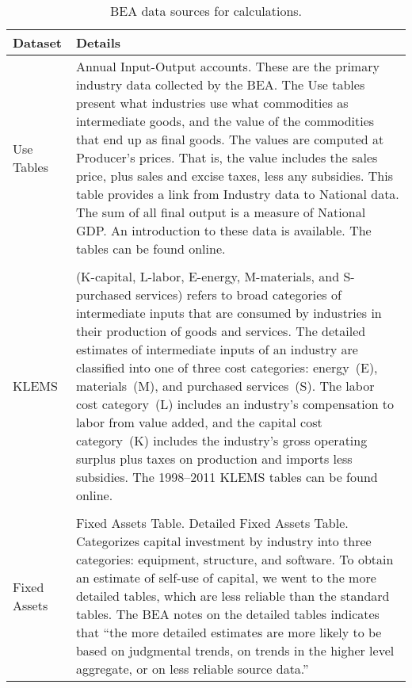 \begin{table}
\caption[BEA data sources for calcuations]{BEA
data sources for calculations.}
\begin{center}
  \begin{tabular}{l @{\hspace{2em}} p{10cm}}
   \toprule 
    Dataset & Details  \\ 

	\midrule
Use Tables & Annual Input-Output accounts. 
	These are the primary industry data collected by the BEA\index{Bureau of Economic Analysis}.
	The Use tables present what industries use what commodities 
	as intermediate goods, and the value of the commodities that end up as final goods. 
	The values are computed at Producer’s prices. 
	That is, the value includes the sales price, plus sales and excise taxes, 
	less any subsidies. 
	This table provides a link from Industry data to National data. 
	The sum of all final output is a measure of National GDP\@.
	An introduction to these data is available.\cite{Streitwieser:2011aa}
	The tables can be found online.\cite{BEAIOData}\\
 &\\

KLEMS & (K-capital, L-labor, E-energy, M-materials, and S-purchased services) 
	refers to broad categories of intermediate inputs 
	that are consumed by industries in their production 
	of goods and services.\cite{Strassner:2005aa}
	The detailed estimates of intermediate inputs of an industry 
	are classified into one of three cost categories:
	energy~(E), materials~(M), and purchased services~(S).
	The labor cost category~(L) includes an industry’s compensation to labor from value added, 
	and the capital cost category~(K) includes the industry’s 
	gross operating surplus plus taxes on production and imports less subsidies.  
	The 1998--2011 KLEMS tables can be found online.\cite{BEAKLEMSData}\\
 & \\
Fixed Assets &  Fixed Assets Table. Detailed Fixed Assets Table. 
	Categorizes capital investment by industry into three categories:
	equipment, structure, and software. 
	To obtain an estimate of self-use of capital, 
	we went to the more detailed tables, 
	which are less reliable than the standard tables. 
	The BEA\index{Bureau of Economic Analysis} notes on the detailed tables indicates that 
	``the more detailed estimates are more likely to be based on judgmental trends, 
	on trends in the higher level aggregate, 
	or on less reliable source data.''~\cite[Table~2.5]{BEADetailedData}\\
    \bottomrule
  \end{tabular}

\end{center}
\label{tab:data_definitions}
\end{table}

